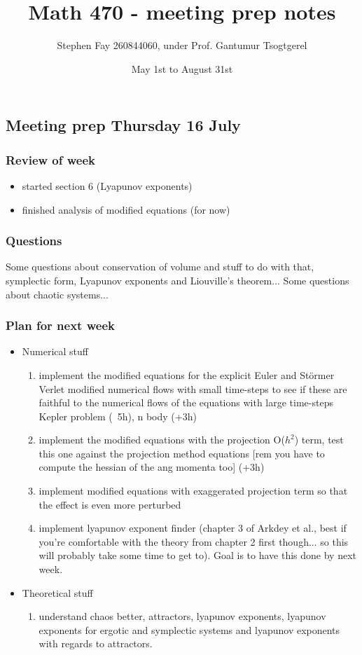 \documentclass[12pt]{article}
\begin{document}
\title{Math 470 - meeting prep notes}
\author{Stephen Fay 260844060, under Prof. Gantumur Tsogtgerel}
\date{May 1st to August 31st}
\maketitle

\subsection{Meeting prep Thursday 16 July}
\subsubsection{Review of week}
\begin{itemize}
    \item started section 6 (Lyapunov exponents)
    \item finished analysis of modified equations (for now)
\end{itemize}
\subsubsection{Questions}
Some questions about conservation of volume and stuff to do with that, symplectic form, Lyapunov exponents and Liouville's theorem... Some questions about chaotic systems...
\subsubsection{Plan for next week}
\begin{itemize}
    \item Numerical stuff
    \begin{enumerate}
        \item implement the modified equations for the explicit Euler and St\"ormer Verlet modified numerical flows with small time-steps to see if these are faithful to the numerical flows of the equations with large time-steps Kepler problem (~5h), n body (+3h)
        \item implement the modified equations with the projection O($h^2$) term, test this one against the projection method equations [rem you have to compute the hessian of the ang momenta too] (+3h)
        \item implement modified equations with exaggerated projection term so that the effect is even more perturbed
        \item implement lyapunov exponent finder (chapter 3 of Arkdey et al., best if you're comfortable with the theory from chapter 2 first though... so this will probably take some time to get to). Goal is to have this done by next week.
    \end{enumerate}
    \item Theoretical stuff
    \begin{enumerate}
        \item understand chaos better, attractors, lyapunov exponents, lyapunov exponents for ergotic and symplectic systems and lyapunov exponents with regards to attractors. 
    \end{enumerate}
\end{itemize}
\end{document}
